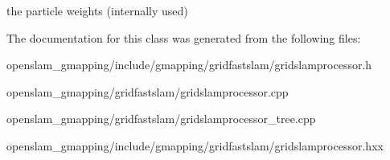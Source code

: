 the particle weights (internally used) 

The documentation for this class was generated from the following files\+:\begin{DoxyCompactItemize}
\item 
openslam\+\_\+gmapping/include/gmapping/gridfastslam/gridslamprocessor.\+h\item 
openslam\+\_\+gmapping/gridfastslam/gridslamprocessor.\+cpp\item 
openslam\+\_\+gmapping/gridfastslam/gridslamprocessor\+\_\+tree.\+cpp\item 
openslam\+\_\+gmapping/include/gmapping/gridfastslam/gridslamprocessor.\+hxx\end{DoxyCompactItemize}
